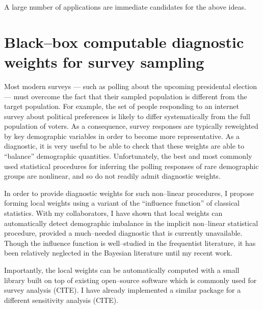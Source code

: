 A large number of applications are immediate candidates for the above ideas.



\section*{Black--box computable diagnostic weights for survey sampling}

Most modern surveys --- such as polling about the upcoming presidental election
--- must overcome the fact that their sampled population is different from the
target population.  For example, the set of people responding to an internet
survey about political preferences is likely to differ systematically from the
full population of voters.  As a consequence, survey responses are typically
reweighted by key demographic variables in order to become more representative.
As a diagnostic, it is very useful to be able to check that these weights are
able to ``balance'' demographic quantities.  Unfortunately, the best and most
commonly used statistical procedures for inferring the polling responses of rare
demographic groups are nonlinear, and so do not readily admit diagnostic
weights.

In order to provide diagnostic weights for such non--linear procedures, I
propose forming local weights using a variant of the ``influence function'' of
classical statistics.  With my collaborators, I have shown that local weights
can automatically detect demographic imbalance in the implicit non--linear
statistical procedure, provided a much--needed diagnostic that is currently
unavailable.  Though the influence function is well--studied in the frequentist
literature, it has been relatively neglected in the Bayesian literature until my
recent work.

Importantly, the local weights can be automatically computed with a 
small library built on top of existing open--source software which
is commonly used for survey analysis (CITE).  I have already implemented
a similar package for a different sensitivity analysis (CITE).








\newpage





